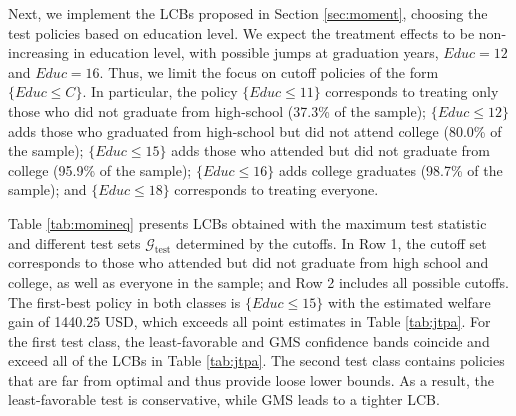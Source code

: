 \documentclass[12pt]{article}
\numberwithin{equation}{section}
\theoremstyle{plain}                         %
\theoremstyle{definition}                  %
\theoremstyle{remark}                      %
\begin{document}
Next, we implement the LCBs proposed in Section \ref{sec:moment}, choosing the test policies based on education level. We expect the treatment effects to be non-increasing in education level, with possible jumps at graduation years, $Educ=12$ and $Educ=16$. Thus, we limit the focus on cutoff policies of the form $\{Educ \leq C\}$. In particular, the policy $\{Educ \leq 11\}$ corresponds to treating only those who did not graduate from high-school (37.3\% of the sample); $\{Educ \leq 12\}$ adds those who graduated from high-school but did not attend college (80.0\% of the sample); $\{Educ \leq 15\}$ adds those who attended but did not graduate from college (95.9\% of the sample); $\{Educ \leq 16\}$ adds college graduates (98.7\% of the sample); and $\{Educ \leq 18\}$ corresponds to treating everyone. 

Table \ref{tab:momineq} presents LCBs obtained with the maximum test statistic and different test sets $\mathcal{G}_{\text{test}}$ determined by the cutoffs. In Row 1, the cutoff set corresponds to those who attended but did not graduate from high school and college, as well as everyone in the sample; and Row 2 includes all possible cutoffs. The first-best policy in both classes is $\{Educ \leq 15\}$ with the estimated welfare gain of 1440.25 USD, which exceeds all point estimates in Table \ref{tab:jtpa}. For the first test class, the least-favorable and GMS confidence bands coincide and exceed all of the LCBs in Table \ref{tab:jtpa}. The second test class contains policies that are far from optimal and thus provide loose lower bounds. As a result, the least-favorable test is conservative, while GMS leads to a tighter LCB.
\end{document}
